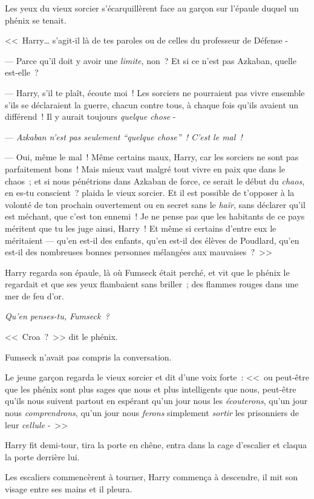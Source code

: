 Les yeux du vieux sorcier s'écarquillèrent face au garçon sur l'épaule duquel un phénix se tenait.

<<~Harry… s'agit-il là de tes paroles ou de celles du professeur de Défense -

--- Parce qu'il doit y avoir une \emph{limite}, non~? Et si ce n'est pas Azkaban, quelle est-elle~?

--- Harry, s'il te plaît, écoute moi~! Les sorciers ne pourraient pas vivre ensemble s'ils se déclaraient la guerre, chacun contre tous, à chaque fois qu'ils avaient un différend~! Il y aurait toujours \emph{quelque chose} -

--- \emph{Azkaban n'est pas seulement “quelque chose”~! C'est le mal~!}

--- Oui, même le mal~! Même certains maux, Harry, car les sorciers ne sont pas parfaitement bons~! Mais mieux vaut malgré tout vivre en paix que dans le chaos~; et si nous pénétrions dans Azkaban de force, ce serait le début du \emph{chaos}, en es-tu conscient~? plaida le vieux sorcier. Et il est possible de t'opposer à la volonté de ton prochain ouvertement ou en secret sans le \emph{haïr}, sans déclarer qu'il est méchant, que c'est ton ennemi~! Je ne pense pas que les habitants de ce pays méritent que tu les juge ainsi, Harry~! Et même si certains d'entre eux le méritaient — qu'en est-il des enfants, qu'en est-il des élèves de Poudlard, qu'en est-il des nombreuses bonnes personnes mélangées aux mauvaises~?~>>

Harry regarda son épaule, là où Fumseck était perché, et vit que le phénix le regardait et que ses yeux flambaient sans briller~; des flammes rouges dans une mer de feu d'or.

\emph{Qu'en penses-tu, Fumseck~?}

<<~Croa~?~>> dit le phénix.

Fumseck n'avait pas compris la conversation.

Le jeune garçon regarda le vieux sorcier et dit d'une voix forte~: <<~ou peut-être que les phénix sont plus sages que nous et plus intelligents que nous, peut-être qu'ils nous suivent partout en espérant qu'un jour nous les \emph{écouterons}, qu'un jour nous \emph{comprendrons}, qu'un jour nous \emph{ferons} simplement \emph{sortir} les prisonniers de leur \emph{cellule} -~>>

Harry fit demi-tour, tira la porte en chêne, entra dans la cage d'escalier et claqua la porte derrière lui.

Les escaliers commencèrent à tourner, Harry commença à descendre, il mit son visage entre ses mains et il pleura.

